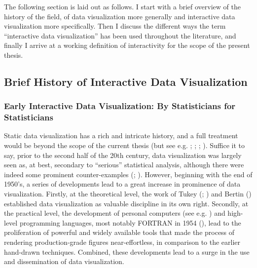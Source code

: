 \documentclass[
]{book}
\theoremstyle{definition}
\theoremstyle{definition}
\theoremstyle{definition}
\theoremstyle{definition}
\theoremstyle{remark}
\begin{document}
The following section is laid out as follows. I start with a brief overview of the history of the field, of data visualization more generally and interactive data visualization more specifically. Then I discuss the different ways the term ``interactive data visualization'' has been used throughout the literature, and finally I arrive at a working definition of interactivity for the scope of the present thesis.

\subsection{Brief History of Interactive Data Visualization}\label{brief-history-of-interactive-data-visualization}

\subsubsection{Early Interactive Data Visualization: By Statisticians for Statisticians}\label{early-interactive-data-visualization-by-statisticians-for-statisticians}

Static data visualization has a rich and intricate history, and a full treatment would be beyond the scope of the current thesis (but see e.g. ; ; ; ). Suffice it to say, prior to the second half of the 20th century, data visualization was largely seen as, at best, secondary to ``serious'' statistical analysis, although there were indeed some prominent counter-examples (; ). However, beginning with the end of 1950's, a series of developments lead to a great increase in prominence of data visualization. Firstly, at the theoretical level, the work of Tukey (; ) and Bertin () established data visualization as valuable discipline in its own right. Secondly, at the practical level, the development of personal computers (see e.g. ) and high-level programming languages, most notably FORTRAN in 1954 (), lead to the proliferation of powerful and widely available tools that made the process of rendering production-grade figures near-effortless, in comparison to the earlier hand-drawn techniques. Combined, these developments lead to a surge in the use and dissemination of data visualization.
\end{document}
